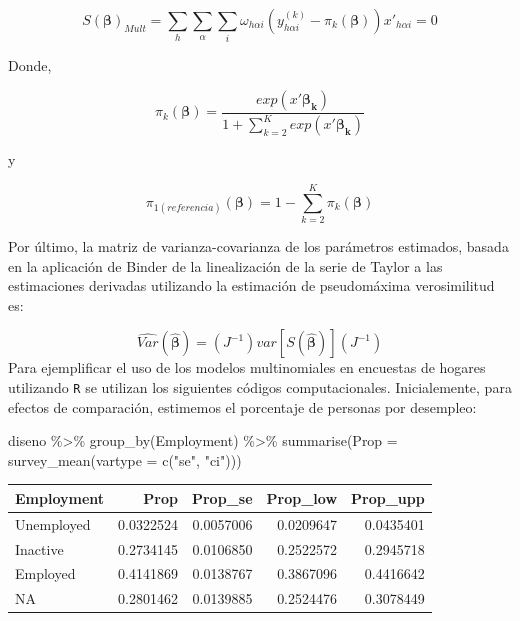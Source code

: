 \documentclass[
  12pt,
]{book}
\newenvironment{Shaded}{\begin{snugshade}}{\end{snugshade}}
\newcommand{\AttributeTok}[1]{\textcolor[rgb]{0.77,0.63,0.00}{#1}}
\newcommand{\FunctionTok}[1]{\textcolor[rgb]{0.00,0.00,0.00}{#1}}
\newcommand{\NormalTok}[1]{#1}
\newcommand{\SpecialCharTok}[1]{\textcolor[rgb]{0.00,0.00,0.00}{#1}}
\newcommand{\StringTok}[1]{\textcolor[rgb]{0.31,0.60,0.02}{#1}}
\begin{document}
\[
S\left(\boldsymbol{\beta}\right)_{Mult}  =  \sum_{h}\sum_{\alpha}\sum_{i}\omega_{h\alpha i}\left(y_{h\alpha i}^{\left(k\right)}-\pi_{k}\left(\boldsymbol{\beta}\right)\right)x'_{h\alpha i}=0
\]

Donde,

\[
\pi_{k}\left(\boldsymbol{\beta}\right)=\frac{exp\left(x'\boldsymbol{\beta_{k}}\right)}{1+{\displaystyle \sum_{k=2}^{K}exp\left(x'\boldsymbol{\beta_{k}}\right)}}
\]

y

\[
\pi_{1\left(referencia\right)}\left(\boldsymbol{\beta}\right)=1-\sum_{k=2}^{K}\pi_{k}\left(\boldsymbol{\beta}\right)
\]

Por último, la matriz de varianza-covarianza de los parámetros estimados, basada en la aplicación de Binder de la linealización de la serie de Taylor a las estimaciones derivadas utilizando la estimación de pseudomáxima verosimilitud es:

\[
\hat{Var}\left(\hat{\boldsymbol{\beta}}\right)  =  \left(J^{-1}\right)var\left[S\left(\hat{\boldsymbol{\beta}}\right)\right]\left(J^{-1}\right)
\]
Para ejemplificar el uso de los modelos multinomiales en encuestas de hogares utilizando \texttt{R} se utilizan los siguientes códigos computacionales. Inicialemente, para efectos de comparación, estimemos el porcentaje de personas por desempleo:

\begin{Shaded}
\begin{Highlighting}[]
\NormalTok{diseno }\SpecialCharTok{\%\textgreater{}\%} \FunctionTok{group\_by}\NormalTok{(Employment) }\SpecialCharTok{\%\textgreater{}\%} 
  \FunctionTok{summarise}\NormalTok{(}\AttributeTok{Prop =} \FunctionTok{survey\_mean}\NormalTok{(}\AttributeTok{vartype =} \FunctionTok{c}\NormalTok{(}\StringTok{"se"}\NormalTok{, }\StringTok{"ci"}\NormalTok{)))}
\end{Highlighting}
\end{Shaded}

\begin{tabular}{l|r|r|r|r}
\hline
Employment & Prop & Prop\_se & Prop\_low & Prop\_upp\\
\hline
Unemployed & 0.0322524 & 0.0057006 & 0.0209647 & 0.0435401\\
\hline
Inactive & 0.2734145 & 0.0106850 & 0.2522572 & 0.2945718\\
\hline
Employed & 0.4141869 & 0.0138767 & 0.3867096 & 0.4416642\\
\hline
NA & 0.2801462 & 0.0139885 & 0.2524476 & 0.3078449\\
\hline
\end{tabular}
\end{document}
